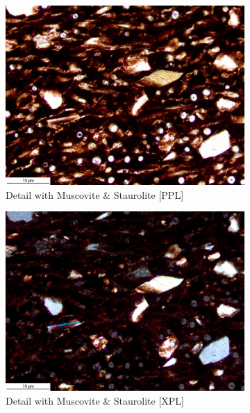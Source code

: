 \documentclass[a4paper]{article}
\begin{document}
\begin{figure}[H]
\begin{subfigure}[t]{.49\textwidth}
		\includegraphics[width=\textwidth]{ThinSections/103-2_20x_PPL.jpg}
		\caption{Detail with Muscovite \& Staurolite [PPL]}
	\end{subfigure}\hspace{.5em}\hfill
	\begin{subfigure}[t]{.49\textwidth}
		\includegraphics[width=\textwidth]{ThinSections/103-2_20x_XPL.jpg}
		\caption{Detail with Muscovite \& Staurolite [XPL]}
	\end{subfigure}\hspace{.5em}\hfill
	\caption{}
	\label{fig:103_mun}
\end{figure}
\end{document}
